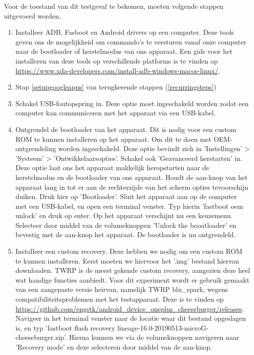 Voor de toestand van dit testgeval te bekomen, moeten volgende stappen uitgevoerd worden.

\begin{enumerate}
    \item Installeer ADB, Fasboot en Android drivers op een computer. Deze tools geven ons de mogelijkheid om commando's te versturen vanaf onze computer naar de bootloader of herstelmodus van ons apparaat. Een gids voor het installeren van deze tools op verschillende platforms is te vinden op \url{https://www.xda-developers.com/install-adb-windows-macos-linux/}.
    \item Stap \ref{setupgoogleapps} van terugkerende stappen (\ref{recurringsteps})
    \item Schakel USB-foutopspring in. Deze optie moet ingeschakeld worden zodat een computer kan communiceren met het apparaat via een USB-kabel.
    \item Ontgrendel de bootloader van het apparaat. Dit is nodig voor een custom ROM te kunnen installeren op het apparaat. Om dit te doen met OEM-ontgrendeling worden ingeschakeld. Deze optie bevindt zich in 'Instellingen' > 'Systeem' > 'Ontwikkelaarsopties'. Schakel ook 'Geavanceerd herstarten' in. Deze optie laat ons het apparaat makkelijk heropstarten naar de herstelmodus en de bootloader van ons apparaat. Houdt de aan-knop van het apparaat lang in tot er aan de rechterzijde van het scherm opties tevoorschijn duiken. Druk hier op 'Bootloader'. Sluit het apparaat aan op de computer met een USB-kabel, en open een terminal venster. Typ hierin 'fastboot oem unlock' en druk op enter. Op het apparaat verschijnt nu een keuzemenu. Selecteer door middel van de volumeknoppen 'Unlock the booatloader' en bevestig met de aan-knop het apparaat. De bootloader is nu ontgrendeld.
    \item 
    Installeer een custom recovery. Deze hebben we nodig om een custom ROM te kunnen installeren. Eerst moeten we hiervoor het '.img' bestand hiervan downloaden. TWRP is de meest gekende custom recovery, aangezien deze heel wat handige functies aanbiedt. Voor dit experiment wordt er gebruik gemaakt van een aangepaste versie heirvan, namelijk TWRP blu\_spark, wegens compatibiliteitsproblemen met het testapparaat. Deze is te vinden op \url{https://github.com/engstk/android_device_oneplus_cheeseburger/releases}. Navigeer in het terminal venster naar de locatie waar dit bestand opgeslagen is, en typ 'fastboot flash recovery lineage-16.0-20190513-microG-cheeseburger.zip'. Hierna kunnen we via de volumeknoppen navigeren naar 'Recovery mode' en deze selecteren door middel van de aan-knop.

\end{enumerate}

